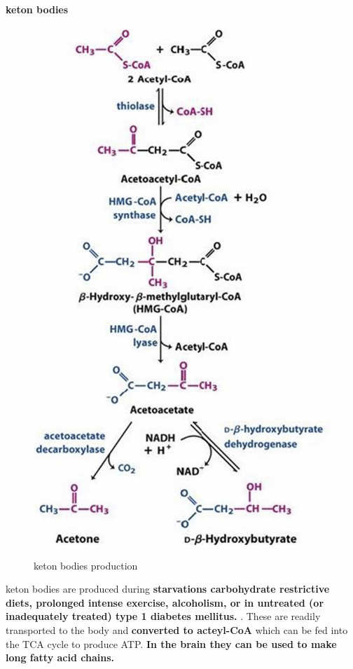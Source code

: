 \documentclass[../main.tex]{subfiles}
\begin{document}
\paragraph{keton bodies}
\begin{figure}[H]
    \centering
    \includegraphics[width=0.3\linewidth]{ketonBodies.png}
    \caption{keton bodies production}
    \label{fig:enter-label}
\end{figure}
keton bodies are produced during \textbf{starvations carbohydrate 
restrictive diets, prolonged intense 
exercise, alcoholism, or in untreated (or 
inadequately treated) type 1 diabetes mellitus. }. These are readily transported to the body and \textbf{converted to acteyl-CoA} which can be fed into the TCA cycle to produce ATP. \textbf{In the brain they can be used to make long fatty acid chains.}
\end{document}

